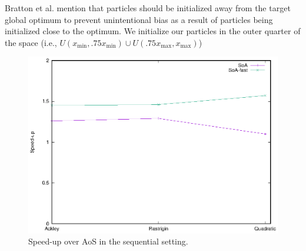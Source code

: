 Bratton et al. \cite{spso} mention that particles should be initialized away
from the target global optimum to prevent unintentional bias as a result of
particles being initialized close to the optimum. We initialize our particles
in the outer quarter of the space
(i.e., $  U(x_{\min}, .75x_{\min}) \cup U(.75x_{\max}, x_{\max})$)


\begin{figure}
  \includegraphics[width=\columnwidth]{../img/output/speedup_seq}
  \caption{Speed-up over AoS in the sequential setting.}\label{fig:seq-baseline}
\end{figure}

% 
% 

